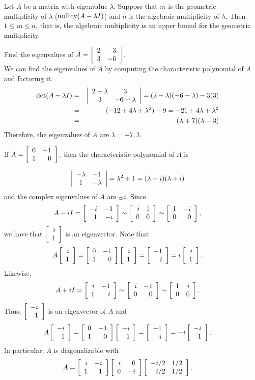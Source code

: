 Let $A$ be a matrix with eigenvalue $\lambda$. Suppose that $m$ is the geometric multiplicity of $\lambda$ ($\nullity(A-\lambda I)$) and $n$ is the algebraic multiplicity of $\lambda$. Then $1 \le m \le n$, that is, the algebraic multiplicity is an upper bound for the geometric multiplicity.\\

\begin{Exam} Find the eigenvalues of $A = \mtx{rr}{2&3\\3&-6}$.\\

We can find the eigenvalues of $A$ by computing the characteristic polynomial of $A$ and factoring it.
\begin{eqnarray*}
\det(A-\lambda I) &=& \dtx{cc}{2-\lambda&3\\3&-6-\lambda} = (2-\lambda)(-6-\lambda) - 3(3)\\
&=& (-12+4\lambda+\lambda^2)-9 = -21 + 4\lambda + \lambda^2\\
&=& (\lambda+7)(\lambda-3)
\end{eqnarray*} Therefore, the eigenvalues of $A$ are $\lambda = -7, 3$.
\end{Exam}\vs

\begin{Exam} If $A = \mtx{rr}{0&-1\\1&0}$, then the characteristic polynomial of $A$ is 

\[\dtx{cc}{-\lambda & -1\\1&-\lambda} = \lambda^2+1 = (\lambda -i)(\lambda +i)\] and the complex eigenvalues of $A$ are $\pm i$. Since \[A-iI = \mtx{rr}{-i&-1\\1&-i}  \sim \mtx{rr}{i&1\\0&0} \sim  \mtx{rr}{1&-i\\0&0},\] we have that $\vr{i\\1}$ is an eigenvector. Note that 
\[A\vr{i\\1} = \mtx{rr}{0&-1\\1&0}\vr{i\\1} = \vr{-1\\i} = i\vr{i\\1}.\] Likewise, 
\[A+iI = \mtx{rr}{i&-1\\1&i}  \sim \mtx{rr}{i&-1\\0&0} \sim  \mtx{rr}{1&i\\0&0}.\] Thus, $\vr{-i\\1}$ is an eigenvector of $A$ and 
\[A\vr{-i\\1} = \mtx{rr}{0&-1\\1&0}\vr{-i\\1} = \vr{-1\\-i} = -i\vr{-i\\1}.\] In particular, $A$ is diagonalizable with 
\[A = \mtx{rr}{i&-i\\1&1}\mtx{rr}{i&0\\0&-i}\mtx{rr}{-i/2&1/2\\i/2&1/2}.\]
\end{Exam}\vs

